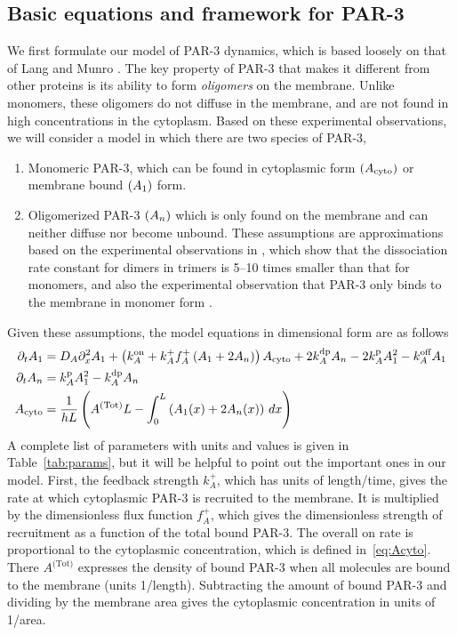 \documentclass[11pt]{article}
\newcommand{\6}[1]{#1_{\text{6}}}
\newcommand{\3}[1]{#1_{\text{3}}}
\newcommand{\Tot}[1]{#1^\text{(Tot)}}
\newcommand{\A}[1]{#1_A}
\begin{document}
\subsection{Basic equations and framework for PAR-3}
We first formulate our model of PAR-3 dynamics, which is based loosely on that of Lang and Munro \cite{lang2022oligomerization}. The key property of PAR-3 that makes it different from other proteins is its ability to form \emph{oligomers} on the membrane. Unlike monomers, these oligomers do not diffuse in the membrane, and are not found in high concentrations in the cytoplasm. Based on these experimental observations, we will consider a model in which there are two species of PAR-3, 
\begin{enumerate}
\item Monomeric PAR-3, which can be found in cytoplasmic form $(A_\text{cyto})$ or membrane bound $(A_1)$ form.
\item Oligomerized PAR-3 $(A_n)$ which is only found on the membrane and can neither diffuse nor become unbound. These assumptions are approximations based on the experimental observations in \cite[Fig.~3K]{lang2023oligomerization}, which show that the dissociation rate constant for dimers in trimers is 5--10 times smaller than that for monomers, and also the experimental observation that PAR-3 only binds to the membrane in monomer form \cite{lang2023oligomerization}.
\end{enumerate}
Given these assumptions, the model equations in dimensional form are as follows
\begin{subequations}
\label{eq:P3model}
\begin{align}
\Dt \MA & = \A{D} \Dx^2 \MA + \left(\A{\kon}+\A{\kf}\A{f}^+\left(\MA+2\PA\right)\right)  \MAC + 2\A{\kdp}\PA -2\A{\kp} \MA^2 - \A{\koff}\MA \\
\Dt \PA & =\A{\kp}\MA^2- \A{\kdp}\PA \\ \label{eq:Acyto}
A_\text{cyto} & = \frac{1}{h L} \left(\Tot{A} L - \int_0^L \left(A_1(x)+2A_n(x)\right) \, dx \right)
\end{align}
\end{subequations}
A complete list of parameters with units and values is given in Table\ \ref{tab:params}, but it will be helpful to point out the important ones in our model. First, the feedback strength $k_A^+$, which has units of length/time, gives the rate at which cytoplasmic PAR-3 is recruited to the membrane. It is multiplied by the dimensionless flux function $f_A^+$, which gives the dimensionless strength of recruitment as a function of the total bound PAR-3. The overall on rate is proportional to the cytoplasmic concentration, which is defined in\ \eqref{eq:Acyto}. There $\Tot{A}$ expresses the density of bound PAR-3 when all molecules are bound to the membrane (units 1/length). Subtracting the amount of bound PAR-3 and dividing by the membrane area gives
the cytoplasmic concentration in units of 1/area.
\end{document}
